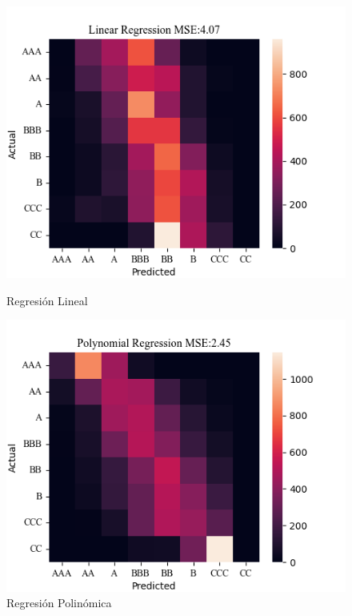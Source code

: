 \documentclass{article}
\begin{document}
\begin{figure}[H]
    \centering
    \begin{minipage}[b]{0.32\textwidth}
        \includegraphics[width=\textwidth]{confusion_matrix_linear_regression.png}
        \caption{Regresión Lineal}
        \label{fig:confusion_matrix_linear_regression}
    \end{minipage}
    \hfill %
    \begin{minipage}[b]{0.32\textwidth}
        \includegraphics[width=\textwidth]{confusion_matrix_polyreg_model.png}
        \caption{Regresión Polinómica}

\end{minipage}
\end{figure}
\end{document}
